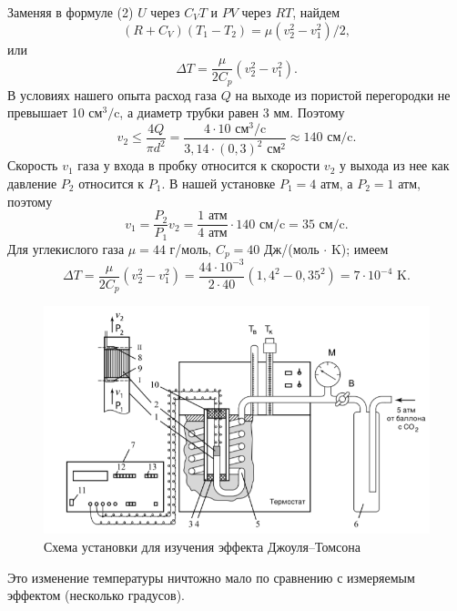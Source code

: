 \documentclass[a4paper, 12pt]{article}
\begin{document}
\indent Заменяя в формуле (2) $U$ через $C_{V}T$ и $PV$ через $RT$, найдем
\begin{equation*}
	(R + C_{V})(T_{1} - T_{2}) = \mu (v_{2}^2 - v_{1}^2)/2,
\end{equation*}
\noindent или
\begin{equation*}
	\Delta T = \frac{\mu}{2C_{p}}(v_{2}^2 - v_{1}^2).
\end{equation*}
\noindent В условиях нашего опыта расход газа $Q$ на выходе из пористой перегородки не превышает 10 см$^3/$c, а диаметр трубки равен 3 мм. Поэтому
\begin{equation*}
	v_{2} \leqslant \frac{4Q}{\pi d^2} = \frac{4 \cdot 10  \text{ см}^3/\text{c}}{3,14 \cdot (0,3)^2 \text{ см}^2} \approx 140 \text{ см/c}.
\end{equation*}
\noindent Скорость $v_{1}$ газа у входа в пробку относится к скорости $v_{2}$ у выхода из нее как давление $P_{2}$ относится к $P_{1}$. В нашей установке $P_{1} = 4 $ атм, а $P_{2} = 1 $ атм, поэтому
\begin{equation*}
	v_{1} = \frac{P_{2}}{P_{1}}v_{2} = \frac{1 \text{ атм}}{4 \text{ атм}}\cdot 140 \text{ см/c} = 35 \text{ см/c}.
\end{equation*}
\noindent Для углекислого газа $\mu = 44$ г/моль, $C_{p} = 40$ Дж/(моль $\cdot$ K); имеем
\begin{equation*}
	\Delta T = \frac{\mu}{2C_{p}}(v_{2}^2 - v_{1}^2) = \frac{44 \cdot 10^{-3}}{2 \cdot 40}(1,4^2 - 0,35^2) = 7 \cdot 10^{-4} \text{ K}.
\end{equation*}
\newpage
\begin{figure}[H]
	\centering
	\includegraphics{Pictures/Рис 1.png}
	\caption{Схема установки для изучения эффекта Джоуля–Томсона}
\end{figure}
\noindent Это изменение температуры ничтожно мало по сравнению с измеряемым эффектом (несколько градусов).
\end{document}
